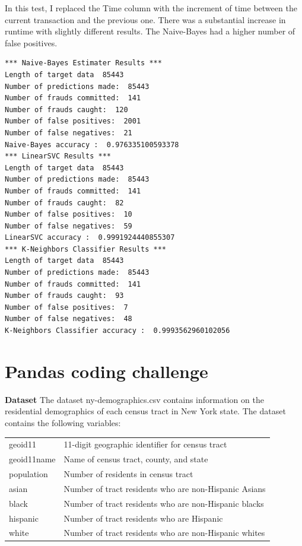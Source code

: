 \documentclass{article}
\begin{document}
\bigskip
In this test, I replaced the Time column with the increment of time between the current transaction and the previous one.  There was a substantial increase in runtime with slightly different results.  The Naive-Bayes had a higher number of false positives.
\begin{lstlisting}
*** Naive-Bayes Estimater Results ***
Length of target data  85443
Number of predictions made:  85443
Number of frauds committed:  141
Number of frauds caught:  120
Number of false positives:  2001
Number of false negatives:  21
Naive-Bayes accuracy :  0.976335100593378
*** LinearSVC Results ***
Length of target data  85443
Number of predictions made:  85443
Number of frauds committed:  141
Number of frauds caught:  82
Number of false positives:  10
Number of false negatives:  59
LinearSVC accuracy :  0.9991924440855307
*** K-Neighbors Classifier Results ***
Length of target data  85443
Number of predictions made:  85443
Number of frauds committed:  141
Number of frauds caught:  93
Number of false positives:  7
Number of false negatives:  48
K-Neighbors Classifier accuracy :  0.9993562960102056
\end{lstlisting}

\section{Pandas coding challenge}
\label{sec:pand}

{\bf Dataset} The dataset ny-demographics.csv contains information on the residential demographics of each
census tract in New York state. The dataset contains the following variables:

\bigskip
\hspace*{\fill}
\begin{tabular}{ll}
geoid11 & 11-digit geographic identifier for census tract\\
geoid11name & Name of census tract, county, and state\\
population & Number of residents in census tract\\
asian & Number of tract residents who are non-Hispanic Asians\\
black & Number of tract residents who are non-Hispanic blacks\\
hispanic & Number of tract residents who are Hispanic\\
white & Number of tract residents who are non-Hispanic whites\\
\end{tabular}
\hspace*{\fill}
\end{document}
